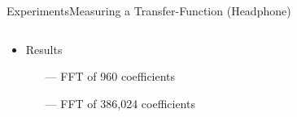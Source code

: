 \begin{frame}{Experiments}{Measuring a Transfer-Function (Headphone)}		
	\begin{columns}
		\begin{column}{0.3\textwidth}
			\begin{itemize}
				\item Results
				\begin{itemize}
					\item[\textcolor{MATLABorange}{---}] FFT of 960 coefficients
					\item[\textcolor{MATLABblue}{---}] FFT of 386,024 coefficients
				\end{itemize}
			\end{itemize}
		\end{column}
		\begin{column}{0.7\textwidth} 
			\begin{figure}[h]
				
			\end{figure}
		\end{column}
	\end{columns}
\end{frame}

